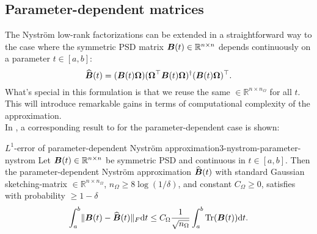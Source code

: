 \subsection{Parameter-dependent matrices}
\label{subsec:3-nystrom-factorization-parameter-matrices}

The Nystr\"om low-rank factorizations can be extended in a straightforward way
to the case where the symmetric \gls{PSD} matrix $\boldsymbol{B}(t) \in \mathbb{R}^{n \times n}$ depends
continuously on a parameter $t \in [a, b]$:
\begin{equation}
    \widehat{\boldsymbol{B}}(t) = (\boldsymbol{B}(t) \boldsymbol{\Omega}) (\boldsymbol{\Omega}^{\top} \boldsymbol{B}(t) \boldsymbol{\Omega})^{\dagger} (\boldsymbol{B}(t) \boldsymbol{\Omega})^{\top}.
    \label{equ:3-nystrom-nystrom-parameter}
\end{equation}
What's special in this formulation is that we reuse the same  $\in \mathbb{R}^{n \times n_{\Omega}}$
for all $t$. This will introduce remarkable gains in terms of computational
complexity of the approximation.\\

In \cite{he2023parameter}, a corresponding result to 
for the parameter-dependent case is shown:
\begin{lemma}{$L^1$-error of parameter-dependent Nystr\"om approximation}{3-nystrom-parameter-nystrom}
    Let $\boldsymbol{B}(t) \in \mathbb{R}^{n \times n}$ be symmetric \gls{PSD} and
    continuous in $t \in [a, b]$. Then the parameter-dependent Nystr\"om approximation
    $\widehat{\boldsymbol{B}}(t)$  with standard
    Gaussian \gls{sketching-matrix} $\in \mathbb{R}^{n \times n_{\Omega}}$,
    $n_{\Omega} \geq 8 \log(1/\delta)$, and constant $C_{\Omega} \geq 0$,
    satisfies with probability $\geq 1 - \delta$
    \begin{equation}
        \int_{a}^{b} \lVert \boldsymbol{B}(t) - \widehat{\boldsymbol{B}}(t) \rVert _F \mathrm{d}t \leq C_{\Omega} \frac{1}{\sqrt{n_{\Omega}}} \int_{a}^{b} \operatorname{Tr}(\boldsymbol{B}(t)) \mathrm{d}t.
    \end{equation}
\end{lemma}

